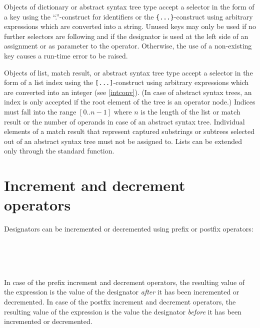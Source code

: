 Objects of dictionary or abstract syntax
tree type accept a selector in the form
of a key using the ``.''-construct for identifiers or the
\lstinline!{...}!-construct using arbitrary expressions which are
converted into a string. Unused keys may only be used if no further
selectors are following and if the designator is used at the left side
of an assignment or as parameter to the  operator.
Otherwise, the use of a non-existing key causes a run-time error to be
raised.

Objects of list, match result,
or abstract syntax tree type
accept a selector in the form of a list index using the
\lstinline![...]!-construct using arbitrary expressions which are
converted into an integer (see \ref{intconv}).
(In case of abstract syntax trees,
an index is only accepted if the root element of the tree is
an operator node.) Indices must fall into the range $[0..n-1]$
where $n$ is the length of the list or match result or the number
of operands in case of an abstract syntax tree. Individual
elements of a match result that represent captured substrings or
subtrees selected out of an abstract syntax tree must
not be assigned to. Lists can be extended only through the
 standard function.

\section{Increment and decrement operators}

Designators can be incremented or decremented using prefix
or postfix operators:

\begin{grammar}
      \produces \lextoken{++}  \\
      \produces \lextoken{$-${}$-$}  \\
      \produces {} \lextoken{++} \\
      \produces {} \lextoken{$-${}$-$}
\end{grammar}

\noindent
In case of the prefix increment and decrement operators,
the resulting value of the expression is the value of
the designator \emph{after} it has been incremented or decremented.
In case of the postfix increment and decrement operators,
the resulting value of the expression is the value
the designator \emph{before} it has been incremented or decremented.


